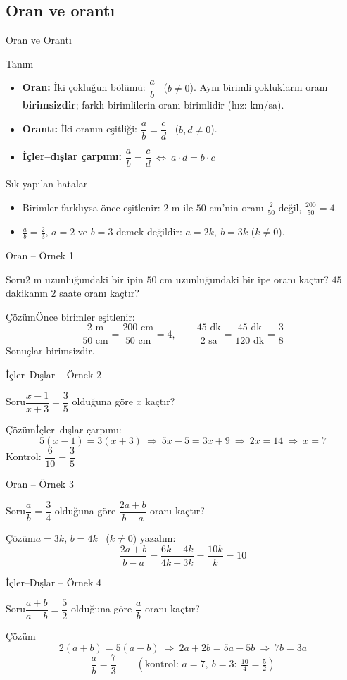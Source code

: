 \documentclass[aspectratio=169,11pt]{beamer}
\newcommand{\soru}[3]{%
\begin{frame}{#1}
  \begin{block}{Soru}\large #2\end{block}
  \pause
  \begin{exampleblock}{Çözüm}\large #3\end{exampleblock}
\end{frame}}
\begin{document}
\subsection{Oran ve orantı}
\begin{frame}{Oran ve Orantı}
\begin{block}{Tanım}
\begin{itemize}
\item \textbf{Oran:} İki çokluğun bölümü: \(\dfrac{a}{b}\) \ (\(b\neq 0\)). Aynı birimli çoklukların oranı \textbf{birimsizdir}; farklı birimlilerin oranı birimlidir (hız: km/sa).
\item \textbf{Orantı:} İki oranın eşitliği: \(\dfrac{a}{b}=\dfrac{c}{d}\) \ (\(b,d\neq 0\)).
\item \textbf{İçler--dışlar çarpımı:} \(\dfrac{a}{b}=\dfrac{c}{d}\ \Longleftrightarrow\ a\cdot d=b\cdot c\)
\end{itemize}
\end{block}
\begin{alertblock}{Sık yapılan hatalar}
\begin{itemize}
\item Birimler farklıysa önce eşitlenir: \(2\) m ile \(50\) cm'nin oranı \(\frac{2}{50}\) değil, \(\frac{200}{50}=4\).
\item \(\frac{a}{b}=\frac{2}{3}\), \(a=2\) ve \(b=3\) demek değildir: \(a=2k,\ b=3k\) (\(k\neq 0\)).
\end{itemize}
\end{alertblock}
\end{frame}

\soru{Oran -- Örnek 1}
{\(2\) m uzunluğundaki bir ipin \(50\) cm uzunluğundaki bir ipe oranı kaçtır? \(45\) dakikanın \(2\) saate oranı kaçtır?}
{Önce birimler eşitlenir:
\[\frac{2\text{ m}}{50\text{ cm}}=\frac{200\text{ cm}}{50\text{ cm}}=4,\qquad \frac{45\text{ dk}}{2\text{ sa}}=\frac{45\text{ dk}}{120\text{ dk}}=\frac{3}{8}\]
Sonuçlar birimsizdir.}

\soru{İçler--Dışlar -- Örnek 2}
{\(\dfrac{x-1}{x+3}=\dfrac{3}{5}\) olduğuna göre \(x\) kaçtır?}
{İçler--dışlar çarpımı:
\[5(x-1)=3(x+3)\ \Rightarrow\ 5x-5=3x+9\ \Rightarrow\ 2x=14\ \Rightarrow\ x=7\]
Kontrol: \(\dfrac{6}{10}=\dfrac{3}{5}\) \checkmark}

\soru{Oran -- Örnek 3}
{\(\dfrac{a}{b}=\dfrac{3}{4}\) olduğuna göre \(\dfrac{2a+b}{b-a}\) oranı kaçtır?}
{\(a=3k\), \(b=4k\) \ (\(k\neq 0\)) yazalım:
\[\frac{2a+b}{b-a}=\frac{6k+4k}{4k-3k}=\frac{10k}{k}=10\]}

\soru{İçler--Dışlar -- Örnek 4}
{\(\dfrac{a+b}{a-b}=\dfrac{5}{2}\) olduğuna göre \(\dfrac{a}{b}\) oranı kaçtır?}
{\[2(a+b)=5(a-b)\ \Rightarrow\ 2a+2b=5a-5b\ \Rightarrow\ 7b=3a\]
\[\frac{a}{b}=\frac{7}{3}\qquad(\text{kontrol: } a=7,\ b=3:\ \tfrac{10}{4}=\tfrac{5}{2})\]}
\end{document}
